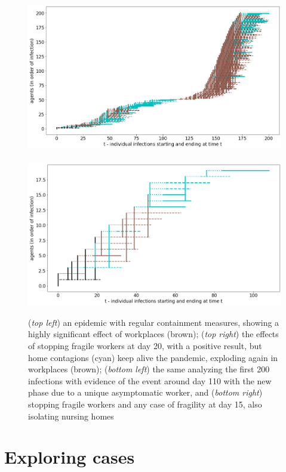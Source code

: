 \documentclass[8pt]{beamer}
\begin{document}
\begin{frame}{}
\begin{figure}[H]
\center
\includegraphics[scale=0.105]{withShort1A200.png}~~~~~~~~~~~\includegraphics[scale=0.105]{withShort1B.png} \\
\caption{(\emph{top left}) an epidemic with regular containment measures, showing a highly significant effect of workplaces (brown);
 (\emph{top right}) the effects of stopping fragile workers at day 20, with a positive result, but home contagions (cyan) keep alive the pandemic, exploding again in workplaces (brown); (\emph{bottom left}) the same analyzing the first 200 infections with evidence of the event around day 110 with the new phase due to a unique asymptomatic worker, and (\emph{bottom right}) stopping fragile workers and any case of fragility at day 15, also isolating nursing homes} 
\label{fourSequences}
\end{figure}

\end{frame}

\section{Exploring cases}
\end{document}
